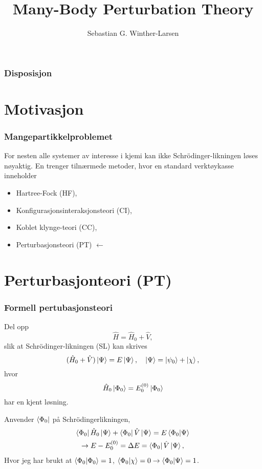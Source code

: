 \documentclass{beamer}
\title[MBPT]{Many-Body Perturbation Theory}
\author{Sebastian G. Winther-Larsen}
\begin{document}
\begin{frame}
	\titlepage
\end{frame}

\begin{frame}
	\frametitle{Disposisjon}
	\tableofcontents
\end{frame}

\section{Motivasjon}
\begin{frame}
	\frametitle{Mangepartikkelproblemet}
	For nesten alle systemer av interesse i kjemi kan ikke Schrödinger-likningen løses nøyaktig. 
	En trenger tilnærmede metoder, hvor en standard verktøykasse inneholder
	\begin{itemize}
	\item Hartree-Fock (HF),
	\item Konfigurasjonsinteraksjonsteori (CI),
	\item Koblet klynge-teori (CC),
	\item Perturbasjonsteori (PT) $\leftarrow$
	\end{itemize}
\end{frame}

\section{Perturbasjonteori (PT)}
\begin{frame}
	\frametitle{Formell pertubasjonsteori}
	
	Del opp 
	\begin{equation}
		\hat H = \hat H_0 + \hat V,
	\end{equation}
	slik at Schrödinger-likningen (SL) kan skrives
	\begin{equation}
		(\hat H_0 + \hat V)\ket{\Psi} = E\ket{\Psi}, \quad \ket{\Psi} = \ket{\psi_0} + \ket{\chi},
	\end{equation}
	hvor
	\begin{equation}
		\hat H_0 \ket{\Phi_0} = E^{(0)}_0\ket{\Phi_0}
	\end{equation}
	har en kjent løsning.
\end{frame}

\begin{frame}
	
	Anvender $\bra{\Phi_0}$ på Schrödingerlikningen,
	\begin{gather}
		\bra{\Phi_0}\hat H_0 \ket{\Psi} + \bra{\Phi_0}\hat V \ket{\Psi} = E\braket{\Phi_0}{\Psi} \\
		\rightarrow E  - E_0^{(0)} = \Delta E = \bra{\Phi_0}\hat V \ket{\Psi},
	\end{gather}
	Hvor jeg har brukt at $\braket{\Phi_0}{\Phi_0} = 1$, $\braket{\Phi_0}{\chi} = 0 \rightarrow \braket{\Phi_0}{\Psi} = 1$.
	
\end{frame}
\end{document}
